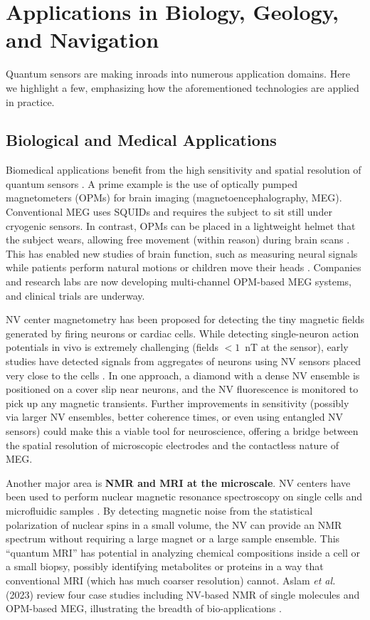 \section{Applications in Biology, Geology, and Navigation}\label{sec:applications}

Quantum sensors are making inroads into numerous application
domains. Here we highlight a few, emphasizing how the aforementioned
technologies are applied in practice.



\subsection{Biological and Medical Applications}

Biomedical applications benefit from the high sensitivity and spatial
resolution of quantum sensors . A prime example is the use of
optically pumped magnetometers (OPMs) for brain imaging
(magnetoencephalography, MEG). Conventional MEG uses SQUIDs and
requires the subject to sit still under cryogenic sensors. In
contrast, OPMs can be placed in a lightweight helmet that the subject
wears, allowing free movement (within reason) during brain scans
. This has enabled new studies of brain function, such as measuring
neural signals while patients perform natural motions or children move
their heads . Companies and research labs are now developing
multi-channel OPM-based MEG systems, and clinical trials are underway.



NV center magnetometry has been proposed for detecting the tiny
magnetic fields generated by firing neurons or cardiac cells. While
detecting single-neuron action potentials in vivo is extremely
challenging (fields $<1$~nT at the sensor), early studies have
detected signals from aggregates of neurons using NV sensors placed
very close to the cells . In one approach, a diamond with a dense NV
ensemble is positioned on a cover slip near neurons, and the NV
fluorescence is monitored to pick up any magnetic transients. Further
improvements in sensitivity (possibly via larger NV ensembles, better
coherence times, or even using entangled NV sensors) could make this a
viable tool for neuroscience, offering a bridge between the spatial
resolution of microscopic electrodes and the contactless nature of
MEG.



Another major area is \textbf{NMR and MRI at the microscale}. NV
centers have been used to perform nuclear magnetic resonance
spectroscopy on single cells and microfluidic samples . By detecting
magnetic noise from the statistical polarization of nuclear spins in a
small volume, the NV can provide an NMR spectrum without requiring a
large magnet or a large sample ensemble. This “quantum MRI” has
potential in analyzing chemical compositions inside a cell or a small
biopsy, possibly identifying metabolites or proteins in a way that
conventional MRI (which has much coarser resolution) cannot. Aslam
\emph{et al.} (2023) review four case studies including NV-based NMR
of single molecules and OPM-based MEG, illustrating the breadth of
bio-applications .




